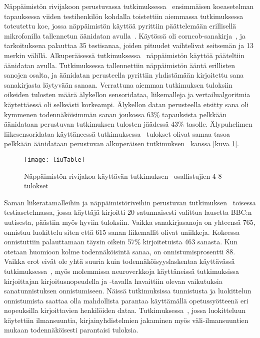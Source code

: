 \documentclass[finnish]{tktltiki2}
\theoremstyle{definition}
\theoremstyle{remark}
\begin{document}
Näppäimistön rivijakoon perustuvassa tutkimuksessa~\cite{liu} ensimmäisen koeasetelman tapauksessa viiden testihenkilön kohdalla toistettiin aiemmassa tutkimuksessa toteutettu koe, jossa näppäimistön käyttöä pyrittiin päättelemään erillisellä mikrofonilla tallennetun äänidatan avulla~\cite{berger}. Käytössä oli corncob-sanakirja~\cite{corn}, ja tarkoituksena palauttaa 35 testisanaa, joiden pituudet vaihtelivat seitsemän ja 13 merkin välillä.
Alkuperäisessä tutkimuksessa~\cite{berger} näppäimistön käyttöä pääteltiin äänidatan avulla. Tutkimuksessa tallennettiin näppäimistön ääntä erillisten sanojen osalta, ja äänidatan perusteella pyrittiin yhdistämään kirjoitettu sana sanakirjasta löytyvään sanaan. Verrattuna aiemman tutkimuksen tuloksiin oikeiden tulosten määrä älykellon sensoridataa, liikemalleja ja vertailualgoritmia käytettäessä oli selkeästi korkeampi. Älykellon datan perusteella etsitty sana oli kymmenen todennäköisimmän sanan joukossa 63\% tapauksista pelkkään äänidataan perustuvan tutkimuksen tulosten jäädessä 43\% tasolle. Älypuhelimen liikesensoridataa käyttäneessä tutkimuksessa~\cite{mar} tulokset olivat samaa tasoa pelkkään äänidataan perustuvan alkuperäisen tutkimuksen~\cite{berger} kanssa [kuva \ref{fig:liuTable}].

\begin{figure} [!bp]
\centering
\texttt{[image: liuTable]}
\caption{Näppäimistön rivijakoa käyttävän tutkimuksen~\cite{liu} osallistujien 4-8 tulokset}
\label{fig:liuTable}
\end{figure}

\pagebreak
Saman liikeratamalleihin ja näppäimistöriveihin perustuvan tutkimuksen~\cite{liu} toisessa testiasetelmassa, jossa käyttäjä kirjoitti 20 satunnaisesti valittua lausetta BBC:n uutisesta, päästiin myös hyviin tuloksiin. Vaikka sanakirjasanoja on yhteensä 765, onnistuu luokittelu siten että 615 sanan liikemallit olivat uniikkeja. Kokeessa onnistuttiin palauttamaan täysin oikein 57\% kirjoitetuista 463 sanasta. Kun otetaan huomioon kolme todennäköisintä sanaa, on onnistumisprosentti 88.
Vaikka erot eivät ole yhtä suuria kuin todennäköisyyslaskentaa käyttävässä tutkimuksessa~\cite{mole}, myös molemmissa neuroverkkoja käyttäneissä tutkimuksissa kirjoittajan kirjoitusnopeudella ja -tavalla havaittiin olevan vaikutuksia sanatunnistuksen onnistumiseen. Näissä tutkimuksissa tunnistusta ja luokittelun onnistumista saattaa olla mahdollista parantaa käyttämällä opetussyötteenä eri nopeuksilla kirjoittavien henkilöiden dataa. Tutkimuksessa~\cite{maiti}, jossa luokitteluun käytettiin ilmansuuntia, kirjainyhdistelmien jakaminen myös väli-ilmansuuntien mukaan todennäköisesti parantaisi tuloksia.
\end{document}
